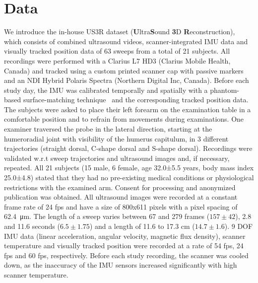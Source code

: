 \section{Data}
We introduce the in-house US3R dataset (\textbf{U}ltra\textbf{S}ound \textbf{3}D \textbf{R}econstruction), which consists of combined ultrasound videos, scanner-integrated IMU data and visually tracked position data of 63 sweeps from a total of 21 subjects. All recordings were performed with a Clarius L7 HD3 (Clarius Mobile Health, Canada) and tracked using a custom printed scanner cap with passive markers and an NDI Hybrid Polaris Spectra (Northern Digital Inc, Canada). Before each study day, the IMU was calibrated temporally and spatially with a phantom-based surface-matching technique~\citep{phantom} and the corresponding tracked position data. 
The subjects were asked to place their left forearm on the examination table in a comfortable position and to refrain from movements during examinations. 
One examiner traversed the probe in the lateral direction, starting at the humeroradial joint with visibility of the humerus capitulum, in 3 different trajectories (straight dorsal, C-shape dorsal and S-shape dorsal). Recordings were validated w.r.t sweep trajectories and ultrasound images and, if necessary, repeated.
All 21 subjects (15 male, 6 female, age 32.0±5.5 years, body mass index 25.0±4.8) stated that they had no pre-existing medical conditions or physiological restrictions with the examined arm. Consent for processing and anonymized publication was obtained.
All ultrasound images were recorded at a constant frame rate of 24 fps and have a size of 800x611 pixels with a pixel spacing of \SI{62.4}{\micro\metre}. The length of a sweep varies between 67 and 279 frames ($157\pm42$), 2.8 and 11.6 seconds ($6.5\pm1.75$) and a length of 11.6 to 17.3 cm ($14.7\pm1.6$). 9 DOF IMU data (linear acceleration, angular velocity, magnetic flux density), scanner temperature and visually tracked position were recorded at a rate of 54 fps, 24 fps and 60 fps, respectively. Before each study recording, the scanner was cooled down, as the inaccuracy of the IMU sensors increased significantly with high scanner temperature. 

